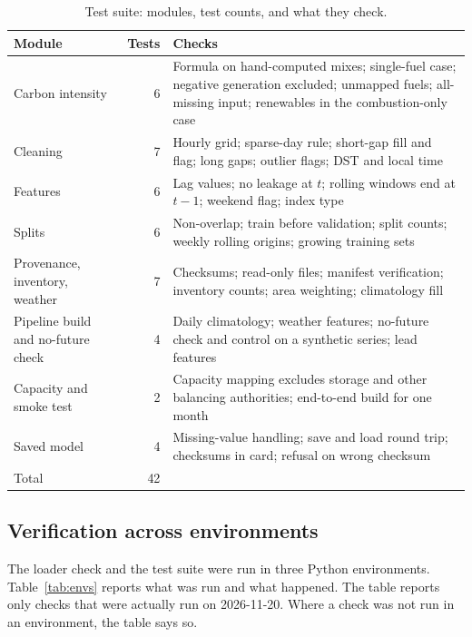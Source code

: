 \documentclass[10pt,journal,compsoc]{IEEEtran}
\begin{document}
\begin{table}[t]
\caption{Test suite: modules, test counts, and what they check.}
\label{tab:tests}
\centering
\small
\begin{tabular}{@{}p{5.5cm}rp{9.5cm}@{}}
\toprule
Module & Tests & Checks \\
\midrule
Carbon intensity & 6 & Formula on hand-computed mixes; single-fuel case; negative generation excluded; unmapped fuels; all-missing input; renewables in the combustion-only case \\
Cleaning & 7 & Hourly grid; sparse-day rule; short-gap fill and flag; long gaps; outlier flags; DST and local time \\
Features & 6 & Lag values; no leakage at $t$; rolling windows end at $t-1$; weekend flag; index type \\
Splits & 6 & Non-overlap; train before validation; split counts; weekly rolling origins; growing training sets \\
Provenance, inventory, weather & 7 & Checksums; read-only files; manifest verification; inventory counts; area weighting; climatology fill \\
Pipeline build and no-future check & 4 & Daily climatology; weather features; no-future check and control on a synthetic series; lead features \\
Capacity and smoke test & 2 & Capacity mapping excludes storage and other balancing authorities; end-to-end build for one month \\
Saved model & 4 & Missing-value handling; save and load round trip; checksums in card; refusal on wrong checksum \\
\midrule
Total & 42 & \\
\bottomrule
\end{tabular}
\end{table}

\subsection{Verification across environments}
The loader check and the test suite were run in three Python environments. Table~\ref{tab:envs} reports what was run and what happened. The table reports only checks that were actually run on 2026-11-20. Where a check was not run in an environment, the table says so.
\end{document}
